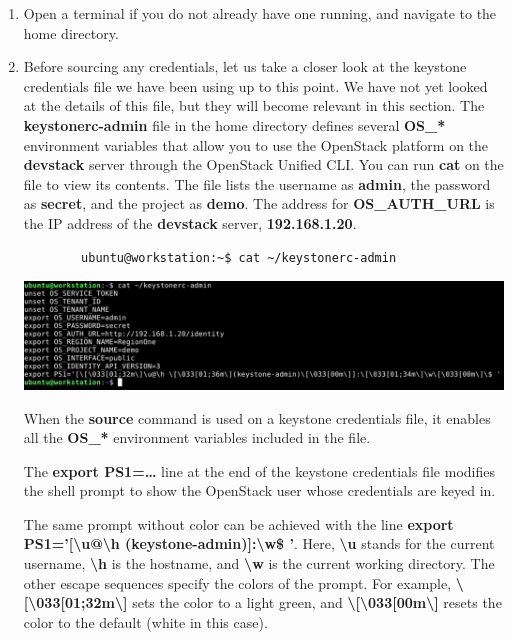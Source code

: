 \documentclass[letterpaper, 12pt]{article}
\begin{document}
\begin{enumerate}
    \item Open a terminal if you do not already have one running, and navigate to the home directory.

    \item Before sourcing any credentials, let us take a closer look at the keystone credentials file we have been using up to this point.
    We have not yet looked at the details of this file, but they will become relevant in this section.
    The \textbf{keystonerc-admin} file in the home directory defines several \textbf{OS\_*} environment variables that allow you to use the OpenStack platform on the \textbf{devstack} server through the OpenStack Unified CLI.
    You can run \textbf{cat} on the file to view its contents.
    The file lists the username as \textbf{admin}, the password as \textbf{secret}, and the project as \textbf{demo}.
    The address for \textbf{OS\_AUTH\_URL} is the IP address of the \textbf{devstack} server, \textbf{192.168.1.20}.
    \begin{lstlisting}
        ubuntu@workstation:~$ cat ~/keystonerc-admin
    \end{lstlisting}

    \begin{center}
        \includegraphics[width=\linewidth]{images/part4/step2.png}
    \end{center}

    \begin{notebox}
        When the \textbf{source} command is used on a keystone credentials file, it enables all the \textbf{OS\_*} environment variables included in the file.
    \end{notebox}

    \begin{notebox}
        The \textbf{export PS1=…} line at the end of the keystone credentials file modifies the shell prompt to show the OpenStack user whose credentials are keyed in.
    \end{notebox}

    \begin{notebox}
        The same prompt without color can be achieved with the line \textbf{export PS1='[\textbackslash u@\textbackslash h (keystone-admin)]:\textbackslash w\$ '}.
        Here, \textbf{\textbackslash u} stands for the current username, \textbf{\textbackslash h} is the hostname, and \textbf{\textbackslash w} is the current working directory.
        The other escape sequences specify the colors of the prompt.
        For example, \textbf{\textbackslash[\textbackslash 033[01;32m\textbackslash]} sets the color to a light green, and \textbf{\textbackslash[\textbackslash 033[00m\textbackslash]} resets the color to the default (white in this case).
    \end{notebox}


\end{enumerate}
\end{document}
